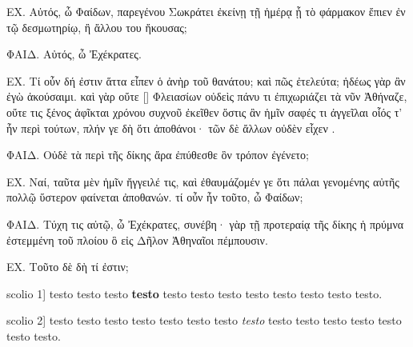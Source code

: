\documentclass[11pt,a4paper]{book}
\newcounter{para}[chapter]\setcounter{para}{0}
\newcommand{\newpara}{%
    \refstepcounter{para}%
    \noindent\llap{\thepstart}}
\begin{document}
\beginnumbering

\pstart
{}ΕΧ. Αὐτός, ὦ Φαίδων, παρεγένου Σωκράτει ἐκείνῃ τῇ ἡμέρᾳ ᾗ τὸ φάρμακον ἔπιεν ἐν τῷ δεσμωτηρίῳ, ἢ ἄλλου του ἤκουσας;

ΦΑΙΔ. Αὐτός, ὦ Ἐχέκρατες.

ΕΧ. Τί οὖν δή ἐστιν ἅττα εἶπεν ὁ ἀνὴρ  τοῦ θανάτου; καὶ πῶς ἐτελεύτα; ἡδέως γὰρ ἂν ἐγὼ ἀκούσαιμι. καὶ γὰρ οὔτε [] Φλειασίων οὐδεὶς πάνυ τι ἐπιχωριάζει τὰ νῦν Ἀθήναζε, οὔτε τις ξένος ἀφῖκται χρόνου συχνοῦ ἐκεῖθεν ὅστις ἂν ἡμῖν σαφές τι ἀγγεῖλαι οἷός τ' ἦν περὶ τούτων, πλήν γε δὴ ὅτι   ἀποθάνοι· τῶν δὲ ἄλλων οὐδὲν εἶχεν .

ΦΑΙΔ. Οὐδὲ τὰ περὶ τῆς δίκης ἄρα ἐπύθεσθε ὃν τρόπον ἐγένετο;

ΕΧ. Ναί, ταῦτα μὲν ἡμῖν ἤγγειλέ τις, καὶ ἐθαυμάζομέν γε ὅτι πάλαι γενομένης αὐτῆς πολλῷ ὕστερον φαίνεται ἀποθανών. τί οὖν ἦν τοῦτο, ὦ Φαίδων;

ΦΑΙΔ. Τύχη τις αὐτῷ, ὦ Ἐχέκρατες, συνέβη·  γὰρ τῇ προτεραίᾳ τῆς δίκης ἡ πρύμνα ἐστεμμένη τοῦ πλοίου ὃ εἰς Δῆλον Ἀθηναῖοι πέμπουσιν.

ΕΧ. Τοῦτο δὲ δὴ τί ἐστιν; 
\pend

\setcounter{pstart}{1}
\numberpstarttrue
    \pstart\newpara \label{scolio1}scolio 1] testo  testo testo \textbf{testo} testo testo testo testo testo testo testo testo.\pend

    \pstart\newpara \label{scolio2}scolio 2]  testo testo testo testo testo testo testo \textit{testo} testo testo testo testo testo testo testo.
    \pend
\end{document}
